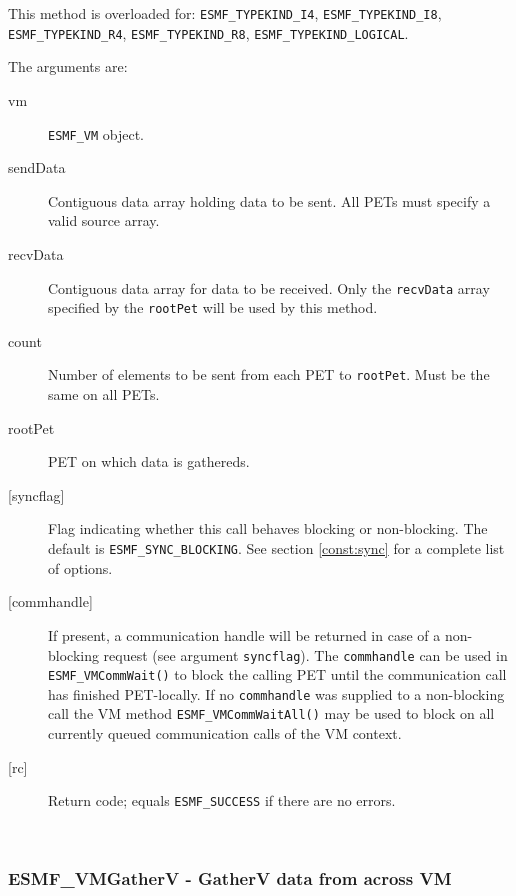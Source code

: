      This method is overloaded for:
     {\tt ESMF\_TYPEKIND\_I4}, {\tt ESMF\_TYPEKIND\_I8},
     {\tt ESMF\_TYPEKIND\_R4}, {\tt ESMF\_TYPEKIND\_R8}, 
     {\tt ESMF\_TYPEKIND\_LOGICAL}.
  
     The arguments are:
     \begin{description}
     \item[vm] 
          {\tt ESMF\_VM} object.
     \item[sendData]
          Contiguous data array holding data to be sent. All PETs must specify a
          valid source array.
     \item[recvData] 
          Contiguous data array for data to be received. Only the {\tt recvData}
          array specified by the {\tt rootPet} will be used by this method.
     \item[count] 
          Number of elements to be sent from each PET to {\tt rootPet}. Must be
          the same on all PETs.
     \item[rootPet] 
          PET on which data is gathereds.
     \item[{[syncflag]}]
          Flag indicating whether this call behaves blocking or non-blocking.
          The default is {\tt ESMF\_SYNC\_BLOCKING}. See section
          \ref{const:sync} for a complete list of options.
     \item[{[commhandle]}]
          If present, a communication handle will be returned in case of a 
          non-blocking request (see argument {\tt syncflag}). The
          {\tt commhandle} can be used in {\tt ESMF\_VMCommWait()} to block the
          calling PET until the communication call has finished PET-locally. If
          no {\tt commhandle} was supplied to a non-blocking call the VM method
          {\tt ESMF\_VMCommWaitAll()} may be used to block on all currently queued
          communication calls of the VM context.
     \item[{[rc]}] 
          Return code; equals {\tt ESMF\_SUCCESS} if there are no errors.
     \end{description}
   
 
\mbox{}\hrulefill\ 
 
\subsubsection [ESMF\_VMGatherV] {ESMF\_VMGatherV - GatherV data from across VM}


